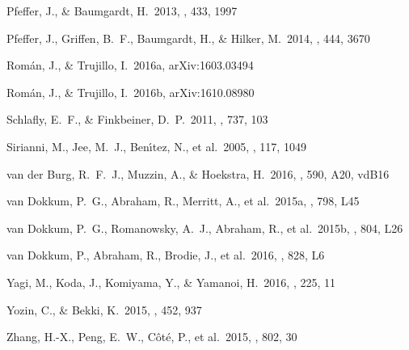 \documentclass[iop,tighten,twocolumn,apj]{emulateapj}
\begin{document}
\begin{thebibliography}{}
 Pfeffer, J., \&
Baumgardt, H.\ 2013, \mnras, 433, 1997

 Pfeffer, J., Griffen, B.~F.,
Baumgardt, H., \& Hilker, M.\ 2014, \mnras, 444, 3670 

 Rom{\'a}n, J., \& Trujillo,
I.\ 2016a, arXiv:1603.03494

 Rom{\'a}n, J., \& Trujillo,
I.\ 2016b, arXiv:1610.08980 

 Schlafly, E.~F.,
\& Finkbeiner, D.~P.\ 2011, \apj, 737, 103

 Sirianni, M., Jee, M.~J.,
Ben{\'{\i}}tez, N., et al.\ 2005, \pasp, 117, 1049

 van der Burg, R.~F.~J., Muzzin, A.,
\& Hoekstra, H.\ 2016, \aap, 590, A20, vdB16

 van Dokkum, P.~G.,
Abraham, R., Merritt, A., et al.\ 2015a, \apjl, 798, L45

 van Dokkum, P.~G.,
Romanowsky, A.~J., Abraham, R., et al.\ 2015b, \apjl, 804, L26

 van Dokkum, P.,
Abraham, R., Brodie, J., et al.\ 2016, \apjl, 828, L6 

 Yagi, M., Koda, J., Komiyama, Y., \&
Yamanoi, H.\ 2016, \apjs, 225, 11 

 Yozin, C., \& Bekki, K.\
2015, \mnras, 452, 937

 Zhang, H.-X., Peng, E.~W.,
C{\^o}t{\'e}, P., et al.\ 2015, \apj, 802, 30

\end{thebibliography}
\end{document}

